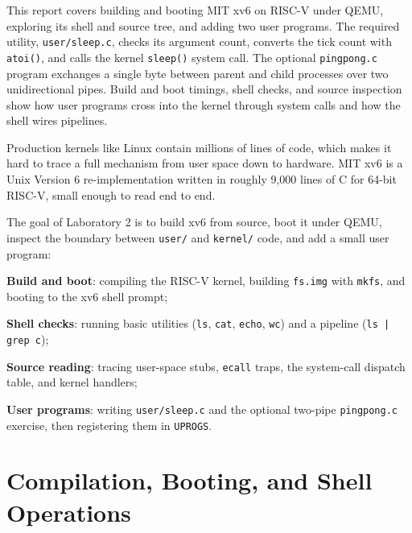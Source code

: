 \documentclass{assets/utmreport}
\begin{document}
\makeutmreporttitlepage
\tableofcontents
\clearpage

\begin{utmabstract}[Abstract]
This report covers building and booting MIT xv6 on RISC-V under QEMU, exploring its shell and source tree, and adding two user programs. The required utility, \texttt{user/sleep.c}, checks its argument count, converts the tick count with \texttt{atoi()}, and calls the kernel \texttt{sleep()} system call. The optional \texttt{pingpong.c} program exchanges a single byte between parent and child processes over two unidirectional pipes. Build and boot timings, shell checks, and source inspection show how user programs cross into the kernel through system calls and how the shell wires pipelines.
\end{utmabstract}

\utmintroduction
Production kernels like Linux contain millions of lines of code, which makes it hard to trace a full mechanism from user space down to hardware. MIT xv6 is a Unix Version 6 re-implementation written in roughly 9,000 lines of C for 64-bit RISC-V, small enough to read end to end.

The goal of Laboratory 2 is to build xv6 from source, boot it under QEMU, inspect the boundary between \texttt{user/} and \texttt{kernel/} code, and add a small user program:
\begin{utmenumerate}
\item \textbf{Build and boot}: compiling the RISC-V kernel, building \texttt{fs.img} with \texttt{mkfs}, and booting to the xv6 shell prompt;
\item \textbf{Shell checks}: running basic utilities (\texttt{ls}, \texttt{cat}, \texttt{echo}, \texttt{wc}) and a pipeline (\texttt{ls | grep c});
\item \textbf{Source reading}: tracing user-space stubs, \texttt{ecall} traps, the system-call dispatch table, and kernel handlers;
\item \textbf{User programs}: writing \texttt{user/sleep.c} and the optional two-pipe \texttt{pingpong.c} exercise, then registering them in \texttt{UPROGS}.
\end{utmenumerate}

\chapter{Compilation, Booting, and Shell Operations}
\end{document}
